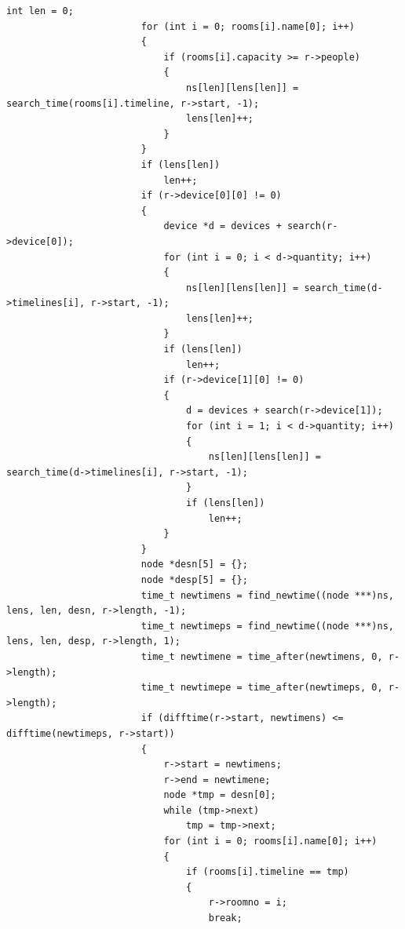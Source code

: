 \documentclass{article}
\begin{document}
\begin{Verbatim}[gobble=8]
                        int len = 0;
                        for (int i = 0; rooms[i].name[0]; i++)
                        {
                            if (rooms[i].capacity >= r->people)
                            {
                                ns[len][lens[len]] = search_time(rooms[i].timeline, r->start, -1);
                                lens[len]++;
                            }
                        }
                        if (lens[len])
                            len++;
                        if (r->device[0][0] != 0)
                        {
                            device *d = devices + search(r->device[0]);
                            for (int i = 0; i < d->quantity; i++)
                            {
                                ns[len][lens[len]] = search_time(d->timelines[i], r->start, -1);
                                lens[len]++;
                            }
                            if (lens[len])
                                len++;
                            if (r->device[1][0] != 0)
                            {
                                d = devices + search(r->device[1]);
                                for (int i = 1; i < d->quantity; i++)
                                {
                                    ns[len][lens[len]] = search_time(d->timelines[i], r->start, -1);
                                }
                                if (lens[len])
                                    len++;
                            }
                        }
                        node *desn[5] = {};
                        node *desp[5] = {};
                        time_t newtimens = find_newtime((node ***)ns, lens, len, desn, r->length, -1);
                        time_t newtimeps = find_newtime((node ***)ns, lens, len, desp, r->length, 1);
                        time_t newtimene = time_after(newtimens, 0, r->length);
                        time_t newtimepe = time_after(newtimeps, 0, r->length);
                        if (difftime(r->start, newtimens) <= difftime(newtimeps, r->start))
                        {
                            r->start = newtimens;
                            r->end = newtimene;
                            node *tmp = desn[0];
                            while (tmp->next)
                                tmp = tmp->next;
                            for (int i = 0; rooms[i].name[0]; i++)
                            {
                                if (rooms[i].timeline == tmp)
                                {
                                    r->roomno = i;
                                    break;

\end{Verbatim}
\end{document}
